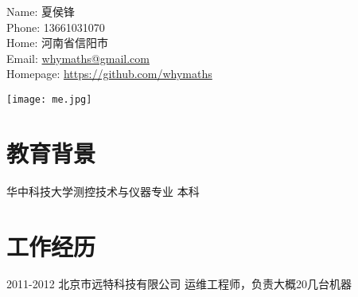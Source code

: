 \documentclass[a4paper,12pt,onecolumn]{article}
\renewenvironment{itemize}{
  \begin{list}{}{
    \setlength{\leftmargin}{1.5em}
    \setlength{\itemsep}{0.25em}
    \setlength{\parskip}{0pt}
    \setlength{\parsep}{0.25em}
  }
}{
  \end{list}
}
\begin{document}
\begin{minipage}{0.495\textwidth}
  Name: 夏侯锋 \\
  Phone: 13661031070 \\
  Home: 河南省信阳市 \\
  Email: \href{mailto:whymaths@gmail.com}{whymaths@gmail.com} \\
  Homepage: \href{https://github.com/whymaths/}{https://github.com/whymaths}
\end{minipage}
\begin{minipage}{0.495\columnwidth}
\centering
\texttt{[image: me.jpg]}
\end{minipage}



\section{教育背景}
\begin{itemize}
        \item 华中科技大学测控技术与仪器专业 本科
\end{itemize}

\section{工作经历}
\begin{itemize}
        \item 2011-2012 北京市远特科技有限公司 运维工程师，负责大概20几台机器
\end{itemize}
\end{document}
